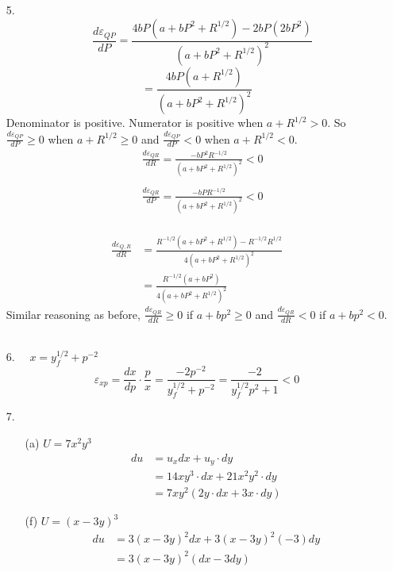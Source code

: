 \documentclass{./../../Latex/homework}
\begin{document}
\begin{enumerate}
\item[5.] $$\quad \frac{d \varepsilon_{Q P}}{d P}=\frac{4 b P\left(a+b P^{2}+R^{1 / 2}\right)-2 b P\left(2 b P^{2}\right)}{\left(a+b P^{2}+R^{1 / 2}\right)^{2}}$$
$$
=\frac{4 b P\left(a+R^{1 / 2}\right)}{\left(a+b P^{2}+R^{1 / 2}\right)^{2}}
$$
Denominator is positive. Numerator is positive when $a+R^{1 / 2}>0$.
So $\frac{d \varepsilon_{Q P}}{d P} \geq 0$ when $ a+R^{1 / 2} \geq 0$ and $\frac{d \varepsilon_{Q P}}{d P} < 0$ when $ a+R^{1 / 2} < 0$. \\
$$
\begin{aligned}
&\frac{d \varepsilon_{Q R}}{d R}=\frac{-b P^{2} R^{-1 / 2}}{\left(a+b P^{2}+R^{1 / 2}\right)^{2}}<0 \\~\\
&\frac{d \varepsilon_{Q R}}{d P}=\frac{-b P R^{-1 / 2}}{\left(a+b P^{2}+R^{1 / 2}\right)^{2}}<0
\end{aligned}
$$ \\
$$
\begin{aligned}
\frac{d \varepsilon_{Q, R}}{d R} &=\frac{R^{-1 / 2}\left(a+b P^{2}+R^{1 / 2}\right)-R^{-1 / 2} R^{1 / 2}}{4\left(a+b P^{2}+R^{1 / 2}\right)^{2}} \\
&=\frac{R^{-1 / 2}\left(a+b P^{2}\right)}{4\left(a+b P^{2}+R^{1 / 2}\right)^{2}}
\end{aligned}
$$
Similar reasoning as before, $\frac{d \varepsilon_{Q R}}{d R} \geq 0$ if $a+b p^{2} \geq 0$ and 
$\frac{d \varepsilon_{Q R}}{d R} < 0$ if $a+b p^{2} < 0$. \\~\\

\item[6.] $\quad x=y_{f}^{1 / 2}+p^{-2}$
$$
\varepsilon_{x p}=\frac{d x}{d p} \cdot \frac{p}{x}=\frac{-2 p^{-2}}{y_{f}^{1 / 2}+p^{-2}}=\frac{-2}{y_{f}^{1 / 2} p^{2}+1}<0
$$

\item[7.] 
\begin{enumerate}

\item[(a)] $U=7 x^{2} y^{3}$
$$
\begin{aligned}
d u &=u_{x} d x+u_{y} \cdot d y \\
&=14 x y^{3} \cdot d x+21 x^{2} y^{2} \cdot d y \\
&=7 x y^{2}(2 y \cdot d x+3 x \cdot d y)
\end{aligned}
$$

\item[(f)] $U =(x-3 y)^{3}$
$$
\begin{aligned}
d u &=3(x-3 y)^{2} d x+3(x-3 y)^{2}(-3)dy \\
&=3(x-3 y)^{2}(d x-3 d y)
\end{aligned}
$$ \\
\end{enumerate}
\end{enumerate}
\end{document}
